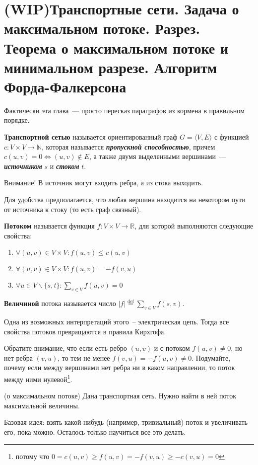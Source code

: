 \let\bf\bfseries
\let\it\itshape
\section{(WIP)Транспортные сети. Задача о максимальном потоке. Разрез. Теорема о максимальном потоке и минимальном разрезе. Алгоритм Форда-Фалкерсона}
Фактически эта глава~--- просто пересказ параграфов из кормена в правильном порядке.
\begin{definition}
	{\bfseries Транспортной сетью} называется ориентированный граф $G=\langle V,E\rangle$ с функцией $c\colon V\times V\to\mathbb{N}$, которая называется {\bf\it пропускной способностью}, причем $c(u,v)=0\iff (u,v)\not\in E$, а также двумя выделенными вершинами~--- {\bf\it источником} $s$ и {\bf\it стоком} $t$.
\end{definition}
Внимание! В источник могут входить ребра, а из стока выходить.

Для удобства предполагается, что любая вершина находится на некотором пути от источника к стоку (то есть граф связный).
\begin{example}
	\needpicture
\end{example}
\begin{definition}
	{\bfseries Потоком} называется функция $f\colon V\times V\to\mathbb{R}$, для которой выполняются следующие свойства:
	\begin{enumerate}
		\item $\forall(u,v)\in V\times V\colon f(u,v)\le c(u,v)$
		\item $\forall(u,v)\in V\times V\colon f(u,v)=-f(v,u)$
		\item $\forall u\in V\smallsetminus\{s,t\}\colon \sum_{v\in V} f(u,v)=0$
	\end{enumerate}
	{\bfseries Величиной} потока называется число $|f|\overset{\mathrm{def}}{=}\sum_{v\in V}f(s,v)$.
\end{definition}
Одна из возможных интерпретаций этого~-- электрическая цепь. Тогда все свойства потоков превращаются в правила Кирхгофа.

Обратите внимание, что если есть ребро $(u,v)$ и с потоком $f(u,v)\ne0$, но нет ребра $(v,u)$, то тем не менее $f(v,u)=-f(u,v)\ne0$. Подумайте, почему если между вершинами нет ребра ни в каком направлении, то поток между ними нулевой\footnote{потому что $0=c(u,v)\ge f(u,v)=-f(v,u)\ge -c(v,u)=0$}.
\begin{problem}(о максимальном потоке)
	Дана транспортная сеть. Нужно найти в ней поток максимальной величины.
\end{problem}
Базовая идея: взять какой-нибудь (например, тривиальный) поток и увеличивать его, пока можно. Осталось только научиться все это делать.

